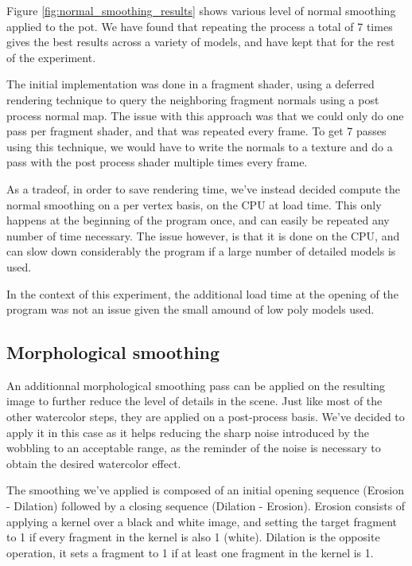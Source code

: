 \documentclass{article}
\begin{document}
\noindent
Figure \ref{fig:normal_smoothing_results} shows various level of normal smoothing applied to the pot. 
We have found that repeating the process a total of 7 times gives the best results across a variety of models,
and have kept that for the rest of the experiment.

\medskip \par
\noindent
The initial implementation was done in a fragment shader, using a deferred rendering technique to query the 
neighboring fragment normals using a post process normal map. The issue with this approach was that we could 
only do one pass per fragment shader, and that was repeated every frame. To get 7 passes using this technique, 
we would have to write the normals to a texture and do a pass with the post process shader multiple times every 
frame.

\medskip \par
\noindent
As a tradeof, in order to save rendering time, we've instead decided compute the normal smoothing on a per vertex basis, on
the CPU at load time. This only happens at the beginning of the program once, and can easily be repeated any 
number of time necessary. The issue however, is that it is done on the CPU, and can slow down considerably the 
program if a large number of detailed models is used. 

\medskip \par
\noindent
In the context of this experiment, the additional load time at the opening of the program was not an issue 
given the small amound of low poly models used.

\subsection{Morphological smoothing}
\label{sec:morph_smoothing_par}

An additionnal morphological smoothing pass can be applied on the resulting image to further reduce the level
of details in the scene. Just like most of the other watercolor steps, they are applied on a post-process basis.
We've decided to apply it in this case as it helps reducing the sharp noise introduced by the wobbling to an
acceptable range, as the reminder of the noise is necessary to obtain the desired watercolor effect.

\medskip \par
\noindent
The smoothing we've applied is composed of an initial opening sequence (Erosion - Dilation) followed by a closing sequence
(Dilation - Erosion). Erosion consists of applying a kernel over a black and white image, and setting the target
fragment to 1 if every fragment in the kernel is also 1 (white). Dilation is the opposite operation, it sets a fragment
to 1 if at least one fragment in the kernel is 1. 
\end{document}
